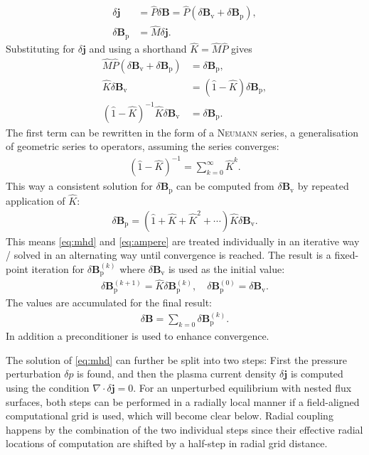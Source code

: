 \documentclass[a4paper, 10pt, english]{article}
\let\vec\symbf
\begin{document}
\begin{align}
  \delta \vec{j} &= \hat{P} \delta \vec{B} = \hat{P} \left ( \delta \vec{B}_{\text{v}} + \delta \vec{B}_{\text{p}} \right ), \\
  \delta \vec{B}_{\text{p}} &= \hat{M} \delta \vec{j}.
\end{align}
Substituting for $\delta \vec{j}$ and using a shorthand $\hat{K} = \hat{M} \hat{P}$ gives
\begin{align}
  \hat{M} \hat{P} \left ( \delta \vec{B}_{\text{v}} + \delta \vec{B}_{\text{p}} \right ) &= \delta \vec{B}_{\text{p}}, \\
  \hat{K} \delta \vec{B}_{\text{v}} &= \left ( \hat{1} - \hat{K} \right ) \delta \vec{B}_{\text{p}}, \\
  \left ( \hat{1} - \hat{K} \right )^{-1} \hat{K} \delta \vec{B}_{\text{v}} &= \delta \vec{B}_{\text{p}}.
\end{align}
The first term can be rewritten in the form of a \textsc{Neumann} series, a generalisation of geometric series to operators, assuming the series converges:
\begin{gather}
  \left ( \hat{1} - \hat{K} \right )^{-1} = \sum_{k = 0}^{\infty} \hat{K}^{k}.
\end{gather}
This way a consistent solution for $\delta \vec{B}_{\text{p}}$ can be computed from $\delta \vec{B}_{\text{v}}$ by repeated application of $\hat{K}$:
\begin{gather}
  \delta \vec{B}_{\text{p}} = \left ( \hat{1} + \hat{K} + \hat{K}^{2} + \dotsb \right ) \hat{K} \delta \vec{B}_{\text{v}}.
\end{gather}
This means \cref{eq:mhd} and \cref{eq:ampere} are treated individually in an iterative way / solved in an alternating way until convergence is reached. The result is a fixed-point iteration for $\delta \vec{B}_{\text{p}}^{(k)}$ where $\delta \vec{B}_{\text{v}}$ is used as the initial value:
\begin{gather}
  \delta \vec{B}_{\text{p}}^{(k+1)} = \hat{K} \delta \vec{B}_{\text{p}}^{(k)}, \quad \delta \vec{B}_{\text{p}}^{(0)} = \delta \vec{B}_{\text{v}}.
\end{gather}
The values are accumulated for the final result:
\begin{gather}
  \delta \vec{B} = \sum_{k = 0} \delta \vec{B}_{\text{p}}^{(k)}.
\end{gather}
In addition a preconditioner is used to enhance convergence.

The solution of \cref{eq:mhd} can further be split into two steps: First the pressure perturbation $\delta p$ is found, and then the plasma current density $\delta \vec{j}$ is computed using the condition $\nabla \cdot \delta \vec{j} = 0$. For an unperturbed equilibrium with nested flux surfaces, both steps can be performed in a radially local manner if a field-aligned computational grid is used, which will become clear below. Radial coupling happens by the combination of the two individual steps since their effective radial locations of computation are shifted by a half-step in radial grid distance.
\end{document}
